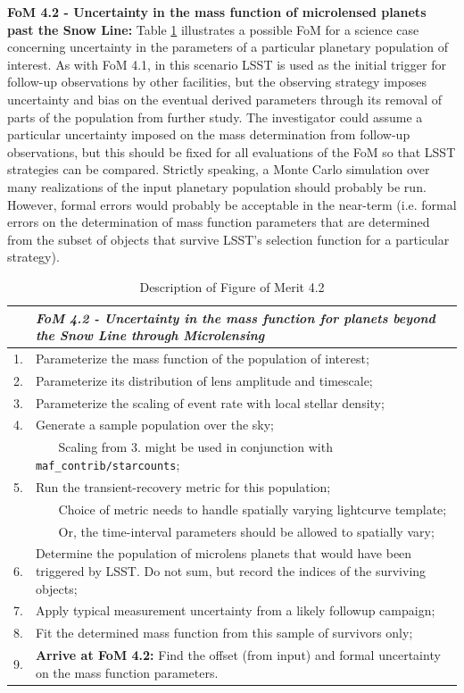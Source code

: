 {\bf FoM 4.2 - Uncertainty in the mass function of microlensed planets
  past the Snow Line:} Table \ref{table:pseudoFOM_4p2}
  illustrates a possible FoM for a science case concerning uncertainty
  in the parameters of a particular planetary population of
  interest. As with FoM 4.1, in this scenario LSST is used as the
  initial trigger for follow-up observations by other facilities, but
  the observing strategy imposes uncertainty and bias on the eventual
  derived parameters through its removal of parts of the population
  from further study. The investigator could assume a particular
  uncertainty imposed on the mass determination from follow-up
  observations, but this should be fixed for all evaluations of the
  FoM so that LSST strategies can be compared. Strictly speaking, a
  Monte Carlo simulation over many realizations of the input planetary
  population should probably be run. However, formal errors would
  probably be acceptable in the near-term (i.e. formal errors on the
  determination of mass function parameters that are determined from
  the subset of objects that survive LSST's selection function for a
  particular strategy).

\begin{table}
  \small
  \begin{tabular}{c p{12cm}}
    & {\it FoM 4.2 - Uncertainty in the mass function for planets beyond the Snow Line through Microlensing}\\
    \hline
  1. & Parameterize the mass function of the population of interest;\\
  2. & Parameterize its distribution of lens amplitude and timescale;\\
  3. & Parameterize the scaling of event rate with local stellar density;\\
  4. & Generate a sample population over the sky; \\
     & ~~~ Scaling from 3. might be used in conjunction with {\tt maf\_contrib/starcounts}; \\
  5. & Run the transient-recovery metric for this population; \\
     & ~~~ Choice of metric needs to handle spatially varying lightcurve template; \\
     & ~~~ Or, the time-interval parameters should be allowed to spatially vary; \\
  6. & Determine the population of microlens planets that would have been triggered by LSST. Do not sum, but record the indices of the surviving objects; \\
  7. & Apply typical measurement uncertainty from a likely followup campaign; \\
  8. & Fit the determined mass function from this sample of survivors only; \\
  9. & {\bf Arrive at FoM 4.2:} Find the offset (from input) and formal uncertainty on the mass function parameters.\\
\hline
    \end{tabular}
 \caption{Description of Figure of Merit 4.2}
  \label{table:pseudoFOM_4p2}
\end{table}


